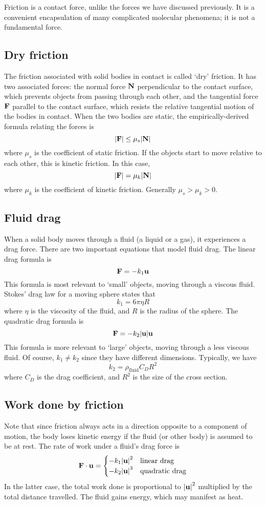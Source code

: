 Friction is a contact force, unlike the forces we have discussed previously.
It is a convenient encapsulation of many complicated molecular phenomena; it is not a fundamental force.

\subsection{Dry friction}
The friction associated with solid bodies in contact is called `dry' friction.
It has two associated forces: the normal force \(\vb N\) perpendicular to the contact surface, which prevents objects from passing through each other, and the tangential force \(\vb F\) parallel to the contact surface, which resists the relative tangential motion of the bodies in contact.
When the two bodies are static, the empirically-derived formula relating the forces is
\[
	\abs{\vb F} \leq \mu_s \abs{\vb N}
\]
where \(\mu_s\) is the coefficient of static friction.
If the objects start to move relative to each other, this is kinetic friction.
In this case,
\[
	\abs{\vb F} = \mu_k \abs{\vb N}
\]
where \(\mu_k\) is the coefficient of kinetic friction.
Generally \(\mu_s > \mu_k > 0\).

\subsection{Fluid drag}
When a solid body moves through a fluid (a liquid or a gas), it experiences a drag force.
There are two important equations that model fluid drag.
The linear drag formula is
\[
	\vb F = -k_1 \vb u
\]
This formula is most relevant to `small' objects, moving through a viscous fluid.
Stokes' drag law for a moving sphere states that
\[
	k_1 = 6 \pi \eta R
\]
where \(\eta\) is the viscosity of the fluid, and \(R\) is the radius of the sphere.
The quadratic drag formula is
\[
	\vb F = -k_2 \abs{\vb u} \vb u
\]
This formula is more relevant to `large' objects, moving through a less viscous fluid.
Of course, \(k_1 \neq k_2\) since they have different dimensions.
Typically, we have
\[
	k_2 = \rho_{\text{fluid}} C_D R^2
\]
where \(C_D\) is the drag coefficient, and \(R^2\) is the size of the cross section.

\subsection{Work done by friction}
Note that since friction always acts in a direction opposite to a component of motion, the body loses kinetic energy if the fluid (or other body) is assumed to be at rest.
The rate of work under a fluid's drag force is
\[
	\vb F \cdot \vb u = \begin{cases}
		-k_1 \abs{\vb u}^2 & \text{linear drag}    \\
		-k_2 \abs{\vb u}^3 & \text{quadratic drag}
	\end{cases}
\]
In the latter case, the total work done is proportional to \(\abs{\vb u}^2\) multiplied by the total distance travelled.
The fluid gains energy, which may manifest as heat.

